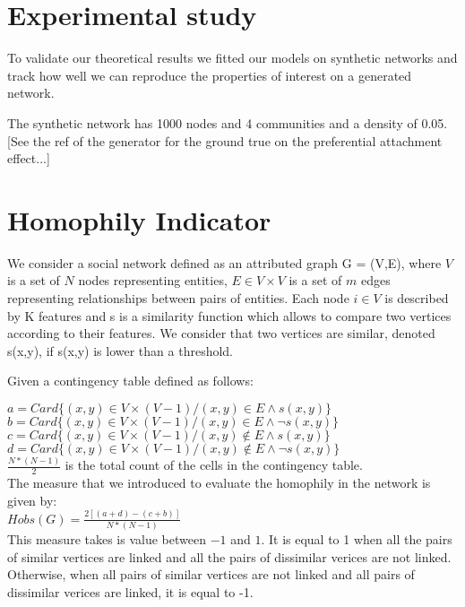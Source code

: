 \section{Experimental study}

To validate our theoretical results we fitted our models on synthetic networks and track how well we can reproduce the properties of interest on a generated network.

The synthetic network has 1000 nodes and 4 communities and a density of 0.05. [See the ref of the generator for the ground true on the preferential attachment effect...]

\section{Homophily Indicator}

We consider a social network defined as an attributed  graph G = (V,E), where $V$ is a set of $N$ nodes representing entities, $E \in V \times V$ is a set of $m$ edges  representing relationships between pairs of entities. Each node $i \in V$ is described by K features and s is a similarity function which allows to compare two vertices according to their features.  
We consider that two vertices are similar, denoted s(x,y), if s(x,y) is lower than a threshold.


Given a contingency table defined as follows:

$a = Card\{(x,y)\in V\times (V-1) / (x,y) \in E \land s(x,y)\}$\\
$b = Card\{(x,y)\in V\times (V-1) / (x,y) \in E \land \neg{s(x,y)}\}$\\
$c = Card\{(x,y)\in V\times (V-1) / (x,y) \notin E \land s(x,y)\}$\\
$d = Card\{(x,y)\in V\times (V-1) / (x,y) \notin E \land \neg{s(x,y)}\}$\\
$\frac{N*(N-1)}{2}$ is the total count of the cells in the contingency table.\\

The measure that we introduced to evaluate the homophily in the network is given by:\\

$Hobs(G) = \frac{2[(a+d)-(c+b)]}{N*(N-1)}$\\
This measure takes is value between $-1$ and $1$. It is equal to 1 when  all the pairs of similar vertices are linked and all the pairs of dissimilar verices are not linked.
Otherwise, when all pairs of similar vertices are not linked and all pairs of dissimilar verices are linked, it is equal to -1.

